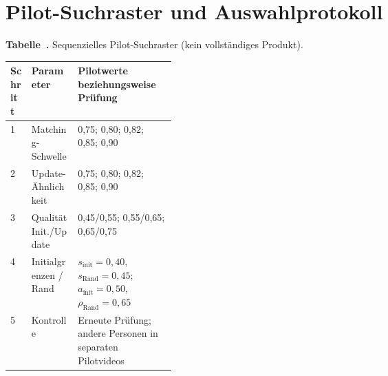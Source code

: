 \documentclass[runningheads,a4paper]{llncs}
\begin{document}
\clearpage
\section{Pilot-Suchraster und Auswahlprotokoll}
\label{app:pilot-details}

\label{tab:pilot-grid}
\begin{center}
\textbf{Tabelle~\thetable.} Sequenzielles Pilot-Suchraster (kein vollständiges Produkt).
\par\smallskip
\begin{tabularx}{\linewidth}{@{}lp{0.28\linewidth}X@{}}
\toprule
Schritt & Parameter & Pilotwerte beziehungsweise Prüfung \\
\midrule
1 & Matching-Schwelle & 0,75; 0,80; 0,82; 0,85; 0,90 \\
2 & Update-Ähnlichkeit & 0,75; 0,80; 0,82; 0,85; 0,90 \\
3 & Qualität Init./Update & 0,45/0,55; 0,55/0,65; 0,65/0,75 \\
4 & Initialgrenzen / Rand & $s_{\mathrm{init}}=0{,}40$, $s_{\mathrm{Rand}}=0{,}45$; $a_{\mathrm{init}}=0{,}50$, $\rho_{\mathrm{Rand}}=0{,}65$ \\
5 & Kontrolle & Erneute Prüfung; andere Personen in separaten Pilotvideos \\
\bottomrule
\end{tabularx}
\end{center}
\end{document}
